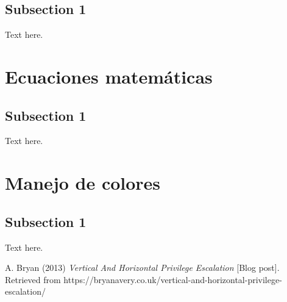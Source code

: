 \documentclass[letterpaper, 10pt, journal]{IEEEtran}
\begin{document}
\subsection{Subsection 1}
Text here.

\section{Ecuaciones matem\'aticas}
\subsection{Subsection 1}
Text here.

\section{Manejo de colores}
\subsection{Subsection 1}
Text here.

\begin{thebibliography}{1}
A. Bryan  (2013) \emph{Vertical And Horizontal Privilege Escalation} [Blog post]. Retrieved from https://bryanavery.co.uk/vertical-and-horizontal-privilege-escalation/



\end{thebibliography}
\end{document}
